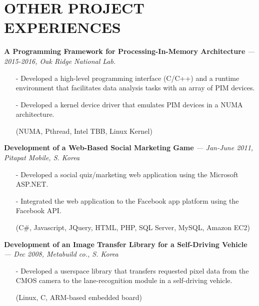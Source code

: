 \section{OTHER PROJECT EXPERIENCES} 
\vspace{0.03in}

  {\bf A Programming Framework for Processing-In-Memory Architecture}
   {\it \footnotesize --- 2015-2016, Oak Ridge National Lab.}
   \begin{itemize}[leftmargin=*]
    \setlength\itemsep{-0.02in}
    \item[-] Developed a high-level programming interface (C/C++) and a runtime environment that
             facilitates data analysis tasks with an array of PIM devices.
    \item[-] Developed a kernel device driver that emulates PIM devices in a NUMA architecture.
    \item[] {\small(NUMA, Pthread, Intel TBB, Linux Kernel)}
   \end{itemize}

  \vspace{-0.15in}
  {\bf Development of a Web-Based Social Marketing Game}
    {\it \footnotesize --- Jan-June 2011, Pitapat Mobile, S. Korea}
    \begin{itemize}[leftmargin=*]
    \setlength\itemsep{-0.02in}
     \item[-] Developed a social quiz/marketing web application using 
              the Microsoft ASP.NET. %
     \item[-] Integrated the web application to the Facebook app platform using the Facebook API.
     \item[]  {\small(C\#, Javascript, JQuery, HTML, PHP, SQL Server, MySQL, Amazon EC2)}
\end{itemize}

  \vspace{-0.15in}
  {\bf Development of an Image Transfer Library for a Self-Driving Vehicle}
    {\it \footnotesize --- Dec 2008, Metabuild co., S. Korea}
    \begin{itemize}[leftmargin=*]
    \setlength\itemsep{-0.02in}
     \item[-] Developed a userspace library that transfers requested pixel data
              from the CMOS camera
              to the lane-recognition module in a self-driving vehicle.
     \item[] {\small(Linux, C, ARM-based embedded board)}
\end{itemize}

